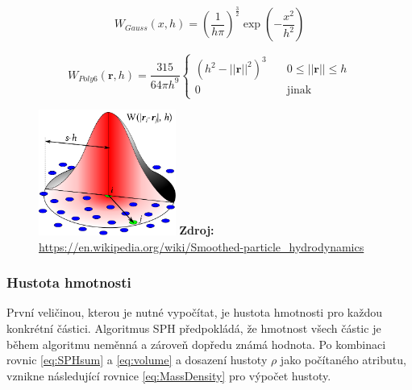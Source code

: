 \begin{equation}
	W_{Gauss}(x,h) = \left(\frac{1}{h\pi}\right)^\frac{3}{2}\exp{\left(-\frac{x^2}{h^2}\right)}
	\label{eq:1DGauss}
\end{equation}

\begin{equation}
	W_{Poly6}(\mathbf{r},h) = \frac{315}{64 \pi h^9}
	\begin{cases}
		(h^2 - ||\mathbf{r}||^2)^3 & \quad 0 \leq ||\mathbf{r}|| \leq h \\
		0                          & \quad \text{jinak}
	\end{cases}
	\label{eq:kernelPoly6}
\end{equation}

\begin{figure}[hbt]
	\centering
	\captionsetup{justification=centering}
	\includegraphics[width=0.4\textwidth]{obrazky-figures/SPHInterpolationColorsVerbose.png}
	\textbf{Zdroj: } \url{https://en.wikipedia.org/wiki/Smoothed-particle_hydrodynamics}
	\label{fig:Kernel}
\end{figure}

\subsubsection{Hustota hmotnosti}
První veličinou, kterou je nutné vypočítat, je hustota hmotnosti pro každou konkrétní částici. Algoritmus SPH předpokládá, že hmotnost všech částic je během algoritmu neměnná a zároveň dopředu známá hodnota. Po kombinaci rovnic \ref{eq:SPHsum} a \ref{eq:volume} a dosazení hustoty $\rho$ jako počítaného atributu, vznikne následující rovnice \ref{eq:MassDensity} pro výpočet hustoty.



